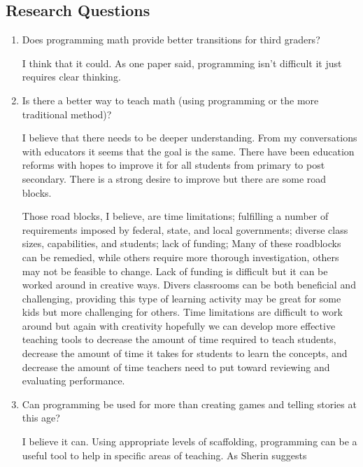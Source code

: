 \subsection*{Research Questions}
\begin{enumerate}
	\item Does programming math provide better transitions for third graders?
	
	I think that it could. As one paper said, programming isn't difficult it just requires clear thinking. 

	\item Is there a better way to teach math (using programming or the more traditional method)? 
	
    I believe that there needs to be deeper understanding. From my conversations with educators it seems that the goal is the same. There have been education reforms with hopes to improve it for all students from primary to post secondary. There is a strong desire to improve but there are some road blocks. 
    
		Those road blocks, I believe, are time limitations; fulfilling a number of requirements imposed by federal, state, and local governments; diverse class sizes, capabilities, and students; lack of funding;
		Many of these roadblocks can be remedied, while others require more thorough investigation, others may not be feasible to change. Lack of funding is difficult but it can be worked around in creative ways. Divers classrooms can be both beneficial and challenging, providing this type of learning activity may be great for some kids but more challenging for others. Time limitations are difficult to work around but again with creativity hopefully we can develop more effective teaching tools to decrease the amount of time required to teach students, decrease the amount of time it takes for students to learn the concepts, and decrease the amount of time teachers need to put toward reviewing and evaluating performance.
	
	\item Can programming be used for more than creating games and telling stories at this age?
	
	I believe it can. Using appropriate levels of scaffolding, programming can be a useful tool to help in specific areas of teaching. As Sherin suggests
	

\end{enumerate}
